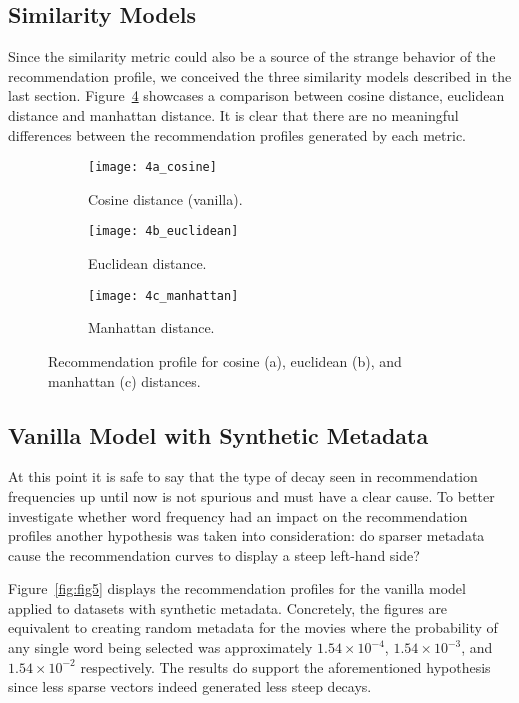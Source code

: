 \subsection{Similarity Models}
\label{subsec:similarity}

Since the similarity metric could also be a source of the strange behavior of
the recommendation profile, we conceived the three similarity models described
in the last section. Figure~\ref{fig:fig4} showcases a comparison between cosine
distance, euclidean distance and manhattan distance. It is clear that there are
no meaningful differences between the recommendation profiles generated by each
metric.

\begin{figure}
  \centering
  \begin{subfigure}{0.3\textwidth}
    \centering
    \texttt{[image: 4a\_cosine]}
    \caption{Cosine distance (vanilla).\label{fig:fig4a}}
  \end{subfigure}
  \begin{subfigure}{0.3\textwidth}
    \centering
    \texttt{[image: 4b\_euclidean]}
    \caption{Euclidean distance.\label{fig:fig4b}}
  \end{subfigure}
  \begin{subfigure}{0.3\textwidth}
    \centering
    \texttt{[image: 4c\_manhattan]}
    \caption{Manhattan distance.\label{fig:fig4c}}
  \end{subfigure}
  \caption{Recommendation profile for cosine (a), euclidean (b), and manhattan
    (c) distances.\label{fig:fig4}}
\end{figure}

\subsection{Vanilla Model with Synthetic Metadata}
\label{subsec:synthetic}

At this point it is safe to say that the type of decay seen in recommendation
frequencies up until now is not spurious and must have a clear cause. To better
investigate whether word frequency had an impact on the recommendation profiles
another hypothesis was taken into consideration: do sparser metadata cause the
recommendation curves to display a steep left-hand side?

Figure~\ref{fig:fig5} displays the recommendation profiles for the vanilla model
applied to datasets with synthetic metadata. Concretely, the figures are
equivalent to creating random metadata for the movies where the probability of
any single word being selected was approximately $1.54 \times 10^{-4}$, $1.54
\times 10^{-3}$, and $1.54 \times 10^{-2}$ respectively. The results do support
the aforementioned hypothesis since less sparse vectors indeed generated less
steep decays.

